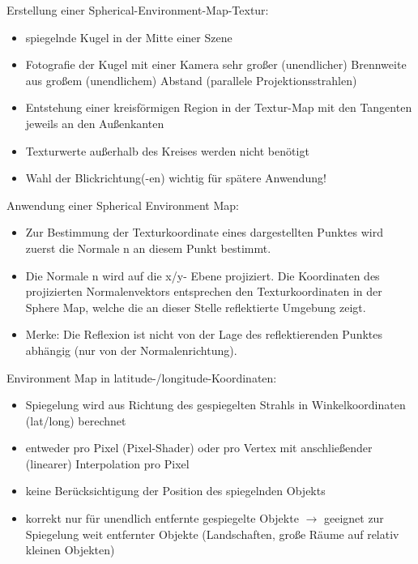 \documentclass[10pt,landscape]{article}
\begin{document}
\begin{multicols}{3}

Erstellung einer Spherical-Environment-Map-Textur:
\begin{itemize}
  \item spiegelnde Kugel in der Mitte einer Szene
  \item Fotografie der Kugel mit einer Kamera sehr großer (unendlicher) Brennweite aus großem (unendlichem) Abstand (parallele Projektionsstrahlen)
  \item Entstehung einer kreisförmigen Region in der Textur-Map mit den Tangenten jeweils an den Außenkanten
  \item Texturwerte außerhalb des Kreises werden nicht benötigt
  \item Wahl der Blickrichtung(-en) wichtig für spätere Anwendung!
\end{itemize}

Anwendung einer Spherical Environment Map:
\begin{itemize}
  \item Zur Bestimmung der Texturkoordinate eines dargestellten Punktes wird zuerst die Normale n an diesem Punkt bestimmt.
  \item Die Normale n wird auf die x/y- Ebene projiziert. Die Koordinaten des projizierten Normalenvektors entsprechen den Texturkoordinaten in der Sphere Map, welche die an dieser Stelle reflektierte Umgebung zeigt.
  \item Merke: Die Reflexion ist nicht von der Lage des reflektierenden Punktes abhängig (nur von der Normalenrichtung).
\end{itemize}

Environment Map in latitude-/longitude-Koordinaten:
\begin{itemize}
  \item Spiegelung wird aus Richtung des gespiegelten Strahls in Winkelkoordinaten (lat/long) berechnet
  \item entweder pro Pixel (Pixel-Shader) oder pro Vertex mit anschließender (linearer) Interpolation pro Pixel
  \item keine Berücksichtigung der Position des spiegelnden Objekts
  \item korrekt nur für unendlich entfernte gespiegelte Objekte $\rightarrow$ geeignet zur Spiegelung weit entfernter Objekte (Landschaften, große Räume auf relativ kleinen Objekten)
\end{itemize}



\end{multicols}
\end{document}
